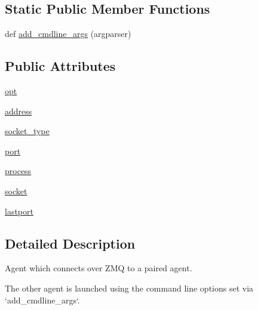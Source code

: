 \subsection*{Static Public Member Functions}
\begin{DoxyCompactItemize}
\item 
def \hyperlink{classparlai_1_1agents_1_1remote__agent_1_1remote__agent_1_1RemoteAgentAgent_ae58e61ee7d8f6373b38389b2e832924b}{add\+\_\+cmdline\+\_\+args} (argparser)
\end{DoxyCompactItemize}
\subsection*{Public Attributes}
\begin{DoxyCompactItemize}
\item 
\hyperlink{classparlai_1_1agents_1_1remote__agent_1_1remote__agent_1_1RemoteAgentAgent_a7b880694aee36d8e2cafb3e53a705a82}{opt}
\item 
\hyperlink{classparlai_1_1agents_1_1remote__agent_1_1remote__agent_1_1RemoteAgentAgent_a7d776b862be52c47de9abb90337e939f}{address}
\item 
\hyperlink{classparlai_1_1agents_1_1remote__agent_1_1remote__agent_1_1RemoteAgentAgent_abcfa336c759d372ad870812bb5ca7dab}{socket\+\_\+type}
\item 
\hyperlink{classparlai_1_1agents_1_1remote__agent_1_1remote__agent_1_1RemoteAgentAgent_aa5ae1ef2a79cff29a766747676e32d08}{port}
\item 
\hyperlink{classparlai_1_1agents_1_1remote__agent_1_1remote__agent_1_1RemoteAgentAgent_afd5b2a4e559fc5a8acbaa6194d4159d5}{process}
\item 
\hyperlink{classparlai_1_1agents_1_1remote__agent_1_1remote__agent_1_1RemoteAgentAgent_a84599f42b9453b6d39279fbbca160737}{socket}
\item 
\hyperlink{classparlai_1_1agents_1_1remote__agent_1_1remote__agent_1_1RemoteAgentAgent_a8be1cf54b584d1b2fbaaf02a5b9d81a0}{lastport}
\end{DoxyCompactItemize}


\subsection{Detailed Description}
\begin{DoxyVerb}Agent which connects over ZMQ to a paired agent.

The other agent is launched using the command line options set via
`add_cmdline_args`.
\end{DoxyVerb}
 

